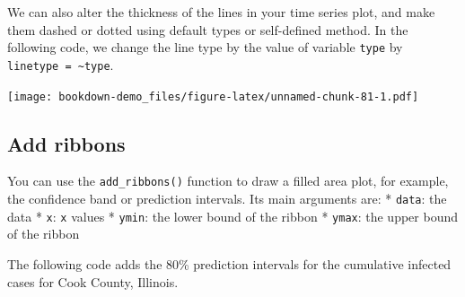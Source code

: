 \documentclass[]{book}
\newenvironment{Shaded}{\begin{snugshade}}{\end{snugshade}}
\newcommand{\KeywordTok}[1]{\textcolor[rgb]{0.13,0.29,0.53}{\textbf{#1}}}
\newcommand{\DataTypeTok}[1]{\textcolor[rgb]{0.13,0.29,0.53}{#1}}
\newcommand{\StringTok}[1]{\textcolor[rgb]{0.31,0.60,0.02}{#1}}
\newcommand{\OtherTok}[1]{\textcolor[rgb]{0.56,0.35,0.01}{#1}}
\newcommand{\OperatorTok}[1]{\textcolor[rgb]{0.81,0.36,0.00}{\textbf{#1}}}
\newcommand{\NormalTok}[1]{#1}
\begin{document}
We can also alter the thickness of the lines in your time series plot,
and make them dashed or dotted using default types or self-defined
method. In the following code, we change the line type by the value of
variable \texttt{type} by \texttt{linetype\ =\ \textasciitilde{}type}.

\begin{Shaded}
\end{Shaded}

\texttt{[image: bookdown-demo\_files/figure-latex/unnamed-chunk-81-1.pdf]}

\subsection{Add ribbons}\label{add-ribbons-1}

You can use the \texttt{add\_ribbons()} function to draw a filled area
plot, for example, the confidence band or prediction intervals. Its main
arguments are: * \texttt{data}: the data * \texttt{x}: \texttt{x} values
* \texttt{ymin}: the lower bound of the ribbon * \texttt{ymax}: the
upper bound of the ribbon

The following code adds the 80\% prediction intervals for the cumulative
infected cases for Cook County, Illinois.
\end{document}
